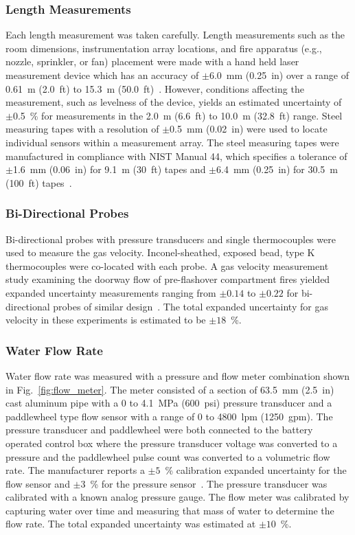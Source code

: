\documentclass[12pt,oneside]{book}
\begin{document}
\subsubsection{Length Measurements}
Each length measurement was taken carefully. Length measurements such as the room dimensions, instrumentation array locations, and fire apparatus (e.g., nozzle, sprinkler, or fan) placement were made with a hand held laser measurement device which has an accuracy of $\pm$6.0~mm (0.25~in) over a range of 0.61~m (2.0~ft) to 15.3~m (50.0~ft)~\cite{StanleyTools}.  However, conditions affecting the measurement, such as levelness of the device, yields an estimated uncertainty of $\pm$0.5~\% for measurements in the 2.0~m (6.6~ft) to 10.0~m (32.8~ft) range. Steel measuring tapes with a resolution of $\pm$0.5~mm (0.02~in) were used to locate individual sensors within a measurement array. The steel measuring tapes were manufactured in compliance with NIST Manual 44, which specifies a tolerance of $\pm$1.6~mm (0.06~in) for 9.1~m (30~ft) tapes and $\pm$6.4~mm (0.25~in) for 30.5~m (100~ft) tapes~\cite{Butcher:2012}.

\subsubsection{Bi-Directional Probes}
Bi-directional probes with pressure transducers and single thermocouples were used to measure the gas velocity. Inconel-sheathed, exposed bead, type K thermocouples were co-located with each probe. A gas velocity measurement study examining the doorway flow of pre-flashover compartment fires yielded expanded uncertainty measurements ranging from $\pm0.14$ to $\pm0.22$ for bi-directional probes of similar design~\cite{Bryant:FSJ2009}. The total expanded uncertainty for gas velocity in these experiments is estimated to be $\pm18$~\%.   

\subsubsection{Water Flow Rate}
Water flow rate was measured with a pressure and flow meter combination shown in Fig.~\ref{fig:flow_meter}. The meter consisted of a section of 63.5~mm (2.5~in) cast aluminum pipe with a 0 to 4.1~MPa (600~psi) pressure transducer and a paddlewheel type flow sensor with a range of 0 to 4800~lpm (1250~gpm). The pressure transducer and paddlewheel were both connected to the battery operated control box where the pressure transducer voltage was converted to a pressure and the paddlewheel pulse count was converted to a volumetric flow rate. The manufacturer reports a $\pm5$~\% calibration expanded uncertainty for the flow sensor and $\pm3$~\% for the pressure sensor~\cite{Akron:2009}. The pressure transducer was calibrated with a known analog pressure gauge. The flow meter was calibrated by capturing water over time and measuring that mass of water to determine the flow rate. The total expanded uncertainty was estimated at $\pm10$~\%. 
\end{document}
